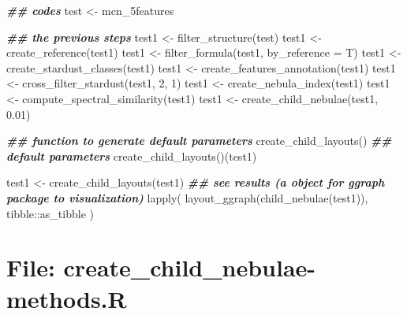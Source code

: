 \documentclass[
]{article}
\newenvironment{Shaded}{\begin{snugshade}}{\end{snugshade}}
\newcommand{\AttributeTok}[1]{\textcolor[rgb]{0.77,0.63,0.00}{#1}}
\newcommand{\DecValTok}[1]{\textcolor[rgb]{0.00,0.00,0.81}{#1}}
\newcommand{\DocumentationTok}[1]{\textcolor[rgb]{0.56,0.35,0.01}{\textbf{\textit{#1}}}}
\newcommand{\FloatTok}[1]{\textcolor[rgb]{0.00,0.00,0.81}{#1}}
\newcommand{\FunctionTok}[1]{\textcolor[rgb]{0.00,0.00,0.00}{#1}}
\newcommand{\NormalTok}[1]{#1}
\newcommand{\OtherTok}[1]{\textcolor[rgb]{0.56,0.35,0.01}{#1}}
\newcommand{\SpecialCharTok}[1]{\textcolor[rgb]{0.00,0.00,0.00}{#1}}
\begin{document}
\begin{Shaded}
\begin{Highlighting}[]
\DocumentationTok{\#\# codes}
\NormalTok{test }\OtherTok{\textless{}{-}}\NormalTok{ mcn\_5features}

\DocumentationTok{\#\# the previous steps}
\NormalTok{test1 }\OtherTok{\textless{}{-}} \FunctionTok{filter\_structure}\NormalTok{(test)}
\NormalTok{test1 }\OtherTok{\textless{}{-}} \FunctionTok{create\_reference}\NormalTok{(test1)}
\NormalTok{test1 }\OtherTok{\textless{}{-}} \FunctionTok{filter\_formula}\NormalTok{(test1, }\AttributeTok{by\_reference =}\NormalTok{ T)}
\NormalTok{test1 }\OtherTok{\textless{}{-}} \FunctionTok{create\_stardust\_classes}\NormalTok{(test1)}
\NormalTok{test1 }\OtherTok{\textless{}{-}} \FunctionTok{create\_features\_annotation}\NormalTok{(test1)}
\NormalTok{test1 }\OtherTok{\textless{}{-}} \FunctionTok{cross\_filter\_stardust}\NormalTok{(test1, }\DecValTok{2}\NormalTok{, }\DecValTok{1}\NormalTok{)}
\NormalTok{test1 }\OtherTok{\textless{}{-}} \FunctionTok{create\_nebula\_index}\NormalTok{(test1)}
\NormalTok{test1 }\OtherTok{\textless{}{-}} \FunctionTok{compute\_spectral\_similarity}\NormalTok{(test1)}
\NormalTok{test1 }\OtherTok{\textless{}{-}} \FunctionTok{create\_child\_nebulae}\NormalTok{(test1, }\FloatTok{0.01}\NormalTok{)}

\DocumentationTok{\#\# function to generate default parameters}
\FunctionTok{create\_child\_layouts}\NormalTok{()}
\DocumentationTok{\#\# default parameters}
\FunctionTok{create\_child\_layouts}\NormalTok{()(test1)}

\NormalTok{test1 }\OtherTok{\textless{}{-}} \FunctionTok{create\_child\_layouts}\NormalTok{(test1)}
\DocumentationTok{\#\# see results (a object for \textquotesingle{}ggraph\textquotesingle{} package to visualization)}
\FunctionTok{lapply}\NormalTok{(}
  \FunctionTok{layout\_ggraph}\NormalTok{(}\FunctionTok{child\_nebulae}\NormalTok{(test1)),}
\NormalTok{  tibble}\SpecialCharTok{::}\NormalTok{as\_tibble}
\NormalTok{)}
\end{Highlighting}
\end{Shaded}

\hypertarget{file-create_child_nebulae-methods.r}{%
\section{File: create\_child\_nebulae-methods.R}\label{file-create_child_nebulae-methods.r}}
\end{document}
